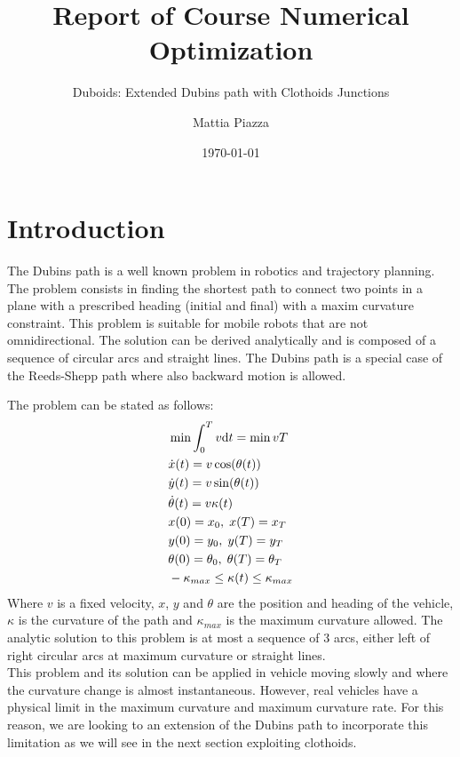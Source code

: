 \documentclass[11pt,twocolumn]{scrartcl}
\title{Report of Course Numerical Optimization}
\subtitle{Duboids: Extended Dubins path with Clothoids Junctions}
\author{Mattia Piazza}
\date{\today}
\begin{document}
\twocolumn[\maketitle ]

  
\section*{Introduction}

The Dubins path is a well known problem in robotics and trajectory planning. The problem consists in finding the shortest path to connect two points in a plane with a prescribed heading (initial and final) with a maxim curvature constraint. This problem is suitable for mobile robots that are not omnidirectional. The solution can be derived analytically and is composed of a sequence of circular arcs and straight lines.\cite{shkel2001classification,chen2019shortest,jha2020shortest} The Dubins path is a special case of the Reeds-Shepp path\cite{duits2018optimal} where also backward motion is allowed.

The problem can be stated as follows:
%
\begin{equation}
  \begin{split}
    &\min \int_0^T v \differential t = \min v T \\ %
    &\dot{x}(t)      = v \cos(\theta(t)) \\
    &\dot{y}(t)      = v \sin(\theta(t)) \\
    &\dot{\theta}(t) = v \kappa(t)       \\
    &x(0)      = x_0,      \; x(T)      = x_T\\
    &y(0)      = y_0,      \; y(T)      = y_T\\
    &\theta(0) = \theta_0, \; \theta(T) = \theta_T\\
    &-\kappa_{max} \le \kappa(t) \le \kappa_{max}   
  \end{split}
\end{equation}
%
Where $v$ is a fixed velocity, $x$, $y$ and $\theta$ are the position and heading of the vehicle, $\kappa$ is the curvature of the path and $\kappa_{max}$ is the maximum curvature allowed. 
The analytic solution to this problem is at most a sequence of 3 arcs, either left of right circular arcs at maximum curvature or straight lines.\cite{shkel2001classification}\\
%
This problem and its solution can be applied in vehicle moving slowly and where the curvature change is almost instantaneous. However, real vehicles have a physical limit in the maximum curvature and maximum curvature rate. For this reason, we are looking to an extension of the Dubins path to incorporate this limitation as we will see in the next section exploiting clothoids.\cite{bertolazzi2015g1,bertolazzi2018clothoids}
%
\end{document}
